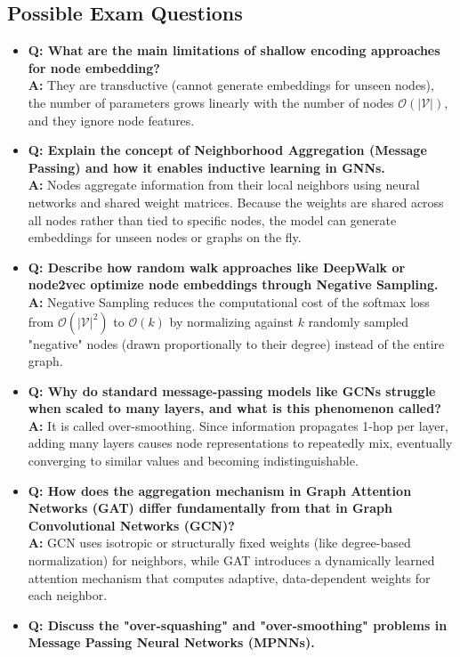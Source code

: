\subsection{Possible Exam Questions}
\begin{itemize}
    \item \textbf{Q: What are the main limitations of shallow encoding approaches for node embedding?} \\
    \textbf{A:} They are transductive (cannot generate embeddings for unseen nodes), the number of parameters grows linearly with the number of nodes $\mathcal{O}(|\mathcal{V}|)$, and they ignore node features.
    \item \textbf{Q: Explain the concept of Neighborhood Aggregation (Message Passing) and how it enables inductive learning in GNNs.} \\
    \textbf{A:} Nodes aggregate information from their local neighbors using neural networks and shared weight matrices. Because the weights are shared across all nodes rather than tied to specific nodes, the model can generate embeddings for unseen nodes or graphs on the fly.
    \item \textbf{Q: Describe how random walk approaches like DeepWalk or node2vec optimize node embeddings through Negative Sampling.} \\
    \textbf{A:} Negative Sampling reduces the computational cost of the softmax loss from $\mathcal{O}(|\mathcal{V}|^2)$ to $\mathcal{O}(k)$ by normalizing against $k$ randomly sampled "negative" nodes (drawn proportionally to their degree) instead of the entire graph.
    \item \textbf{Q: Why do standard message-passing models like GCNs struggle when scaled to many layers, and what is this phenomenon called?} \\
    \textbf{A:} It is called over-smoothing. Since information propagates 1-hop per layer, adding many layers causes node representations to repeatedly mix, eventually converging to similar values and becoming indistinguishable.
    \item \textbf{Q: How does the aggregation mechanism in Graph Attention Networks (GAT) differ fundamentally from that in Graph Convolutional Networks (GCN)?} \\
    \textbf{A:} GCN uses isotropic or structurally fixed weights (like degree-based normalization) for neighbors, while GAT introduces a dynamically learned attention mechanism that computes adaptive, data-dependent weights for each neighbor.
    \item \textbf{Q: Discuss the "over-squashing" and "over-smoothing" problems in Message Passing Neural Networks (MPNNs).} \\

\end{itemize}

